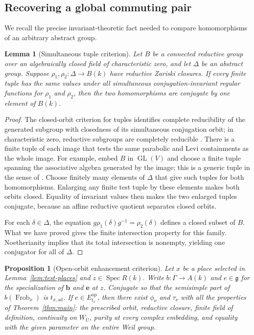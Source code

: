 \documentclass[11pt]{article}
\numberwithin{equation}{section}
\newtheorem{proposition}[theorem]{Proposition}
\newtheorem{lemma}[theorem]{Lemma}
\theoremstyle{definition}
\theoremstyle{remark}
\newcommand{\g}{\mathfrak g}
\newcommand{\Frob}{\operatorname{Frob}}
\newcommand{\Spec}{\operatorname{Spec}}
\newcommand{\GL}{\operatorname{GL}}
\begin{document}
\subsection{Recovering a global commuting pair}

We recall the precise invariant-theoretic fact needed to compare
homomorphisms of an arbitrary abstract group.

\begin{lemma}[Simultaneous tuple criterion]\label{lem:orbit-tuples}
Let $B$ be a connected reductive group over an algebraically closed
field of characteristic zero, and let $\Delta$ be an abstract group.
Suppose $\rho_1,\rho_2:\Delta\to B(k)$ have reductive Zariski
closures.  If every finite tuple has the same values under all
simultaneous conjugation-invariant regular functions for $\rho_1$
and $\rho_2$, then the two homomorphisms are conjugate by one
element of $B(k)$.
\end{lemma}

\begin{proof}
The closed-orbit criterion for tuples identifies complete
reducibility of the generated subgroup with closedness of its
simultaneous conjugation orbit; in characteristic zero, reductive
subgroups are completely reducible
\cite[Section~2.2 and Theorem~3.1]{global:BMR}.  There is a finite tuple of each
image that tests the same parabolic and Levi containments as the
whole image.  For example, embed $B$ in $\GL(V)$ and choose a
finite tuple spanning the associative algebra generated by the image;
this is a generic tuple in the sense of
\cite[Definition~5.4, Lemma~5.5, and Theorem~5.8(iii)]{global:BMRT}.
Choose finitely many elements of $\Delta$ that give such tuples
for both homomorphisms.  Enlarging any finite test tuple by these
elements makes both orbits closed.  Equality of invariant values
then makes the two enlarged tuples conjugate, because an affine
reductive quotient separates closed orbits.

For each $\delta\in\Delta$, the equation
$g\rho_1(\delta)g^{-1}=\rho_2(\delta)$ defines a closed subset
of $B$.  What we have proved gives the finite intersection property
for this family.  Noetherianity implies that its total intersection
is nonempty, yielding one conjugator for all of $\Delta$.
\end{proof}

\begin{proposition}[Open-orbit enhancement criterion]
\label{prop:open-orbit-enhancement}
Let $x$ be a place selected in Lemma~\ref{lem:test-places} and
$z\in\Spec R(k)$.  Write $b:\Gamma\to A(k)$ and $e\in\g$
for the specialization of $\mathbf b$ and $\mathbf e$ at $z$.
Conjugate so that the semisimple part of $b(\Frob_x)$ is
$t_{x,\mathrm{ad}}$.  If $e\in E_{t_x}^{\mathrm{op}}$, then
there exist $\phi_\nu$ and $\tau_\nu$ with all the properties
of Theorem~\ref{thm:main}: the prescribed orbit, reductive
closure, finite field of definition, continuity on $W_U$, purity
at every complex embedding, and equality with the given parameter
on the entire Weil group.
\end{proposition}
\end{document}
